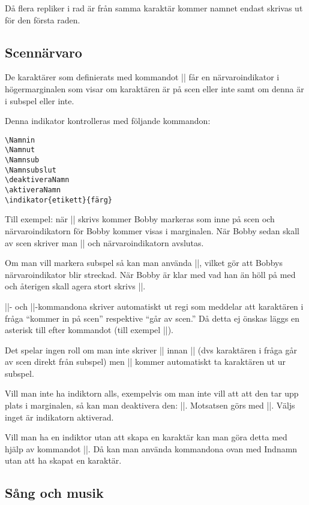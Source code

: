 \documentclass[a4paper,12pt]{article}
\begin{document}
Då flera repliker i rad är från samma karaktär kommer namnet endast skrivas ut för den första raden.



\subsection{Scennärvaro}
\label{sec:narvaro}
De karaktärer som definierats med kommandot |\nyroll| får en närvaroindikator i högermarginalen som visar om karaktären är på scen eller inte samt om denna är i subspel eller inte.

Denna indikator kontrolleras med följande kommandon:
\begin{lstlisting}
\Namnin
\Namnut
\Namnsub
\Namnsubslut
\deaktiveraNamn
\aktiveraNamn
\indikator{etikett}{färg}
\end{lstlisting}

Till exempel: när |\Bobbyin| skrivs kommer Bobby markeras som inne på scen och närvaroindikatorn för Bobby kommer visas i marginalen. När Bobby sedan skall av scen skriver man |\Bobbyut| och närvaroindikatorn avslutas.

Om man vill markera subspel så kan man använda |\Bobbysub|, vilket gör att Bobbys närvaroindikator blir streckad. När Bobby är klar med vad han än höll på med och återigen skall agera stort skrivs |\Bobbysubslut|.

|\Namnin|- och |\Namnut|-kommandona skriver automatiskt ut regi som meddelar att karaktären i fråga ``kommer in på scen'' respektive ``går av scen.'' Då detta ej önskas läggs en asterisk till efter kommandot (till exempel |\Bobbyin*|).

Det spelar ingen roll om man inte skriver |\Namnsubslut| innan |\Namnut| (dvs karaktären i fråga går av scen direkt från subspel) men |\Namnin| kommer automatiskt ta karaktären ut ur subspel.

Vill man inte ha indiktorn alls, exempelvis om man inte vill att att den tar upp plats i marginalen, så kan man deaktivera den: |\deaktiveraBobby|. Motsatsen görs med |\deaktiveraBobby|. Väljs inget är indikatorn aktiverad.

Vill man ha en indiktor utan att skapa en karaktär kan man göra detta med hjälp av kommandot ||. Då kan man använda kommandona ovan med Indnamn utan att ha skapat en karaktär.



\subsection{Sång och musik}
\end{document}

